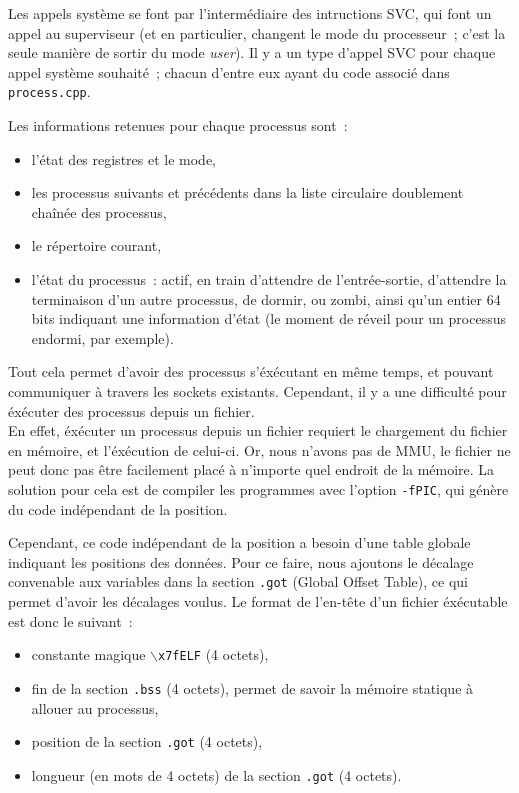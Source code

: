 \documentclass[11pt,a4paper]{article}
\begin{document}
Les appels système se font par l'intermédiaire des intructions SVC,
qui font un appel au superviseur (et en particulier, changent le mode
du processeur~; c'est la seule manière de sortir du mode
\textit{user}). Il y a un type d'appel SVC pour chaque appel système
souhaité~; chacun d'entre eux ayant du code associé dans
\texttt{process.cpp}.

Les informations retenues pour chaque processus sont~:
\begin{itemize}
\item{l'état des registres et le mode,}
\item{les processus suivants et précédents dans la liste circulaire
  doublement chaînée des processus,}
\item{le répertoire courant,}
\item{l'état du processus~: actif, en train d'attendre de
  l'entrée-sortie, d'attendre la terminaison d'un autre processus,
  de dormir, ou zombi, ainsi qu'un entier 64 bits indiquant une
  information d'état (le moment de réveil pour un processus endormi,
  par exemple).}
\end{itemize}

Tout cela permet d'avoir des processus s'éxécutant en même temps, et
pouvant communiquer à travers les sockets existants. Cependant, il
y a une difficulté pour éxécuter des processus depuis un fichier.
\\

En effet, éxécuter un processus depuis un fichier requiert le
chargement du fichier en mémoire, et l'éxécution de celui-ci. Or, nous
n'avons pas de MMU, le fichier ne peut donc pas être facilement placé
à n'importe quel endroit de la mémoire. La solution pour cela est de
compiler les programmes avec l'option \texttt{-fPIC}, qui génère du
code indépendant de la position.

Cependant, ce code indépendant de la position a besoin d'une table
globale indiquant les positions des données. Pour ce faire, nous
ajoutons le décalage convenable aux variables dans la section
\texttt{.got} (Global Offset Table), ce qui permet d'avoir les
décalages voulus. Le format de l'en-tête d'un fichier éxécutable est
donc le suivant~:
\begin{itemize}
\item{constante magique \texttt{$\backslash{}$x7fELF} (4 octets),}
\item{fin de la section \texttt{.bss} (4 octets), permet de savoir la
  mémoire statique à allouer au processus,}
\item{position de la section \texttt{.got} (4 octets),}
\item{longueur (en mots de 4 octets) de la section \texttt{.got} (4 octets).\\}
\end{itemize}
\end{document}
